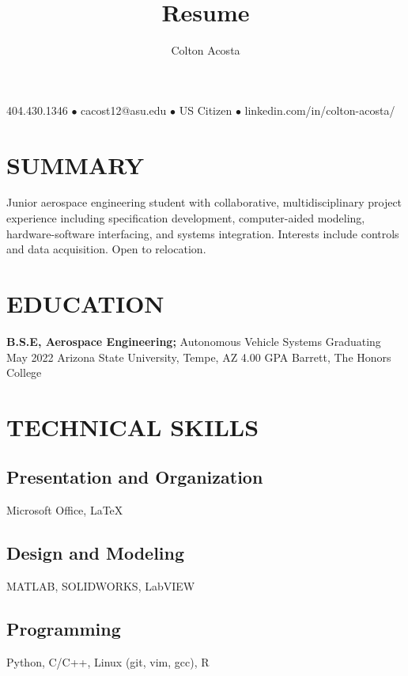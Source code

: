 \documentclass{article}
\makeatletter
\renewcommand{\maketitle}{
	\begin{center}
		{\huge\bfseries
			\theauthor}
			
		404.430.1346 $\bullet$ cacost12@asu.edu $\bullet$ US Citizen $\bullet$ linkedin.com/in/colton-acosta/
	\end{center}
}
\makeatother
\begin{document}
\title{Resume}
\author{Colton Acosta}
\maketitle
\section{SUMMARY}
Junior aerospace engineering student with collaborative, multidisciplinary project experience including specification development, computer-aided modeling, hardware-software interfacing, and systems integration. Interests include controls and data acquisition. Open to relocation. 
\section{EDUCATION}
\textbf{B.S.E, Aerospace Engineering;} Autonomous Vehicle Systems
\hfill 
Graduating May 2022
\linebreak
Arizona State University, Tempe, AZ 
\hfill
4.00 GPA
\linebreak
Barrett, The Honors College

\section{TECHNICAL SKILLS}
\subsection{Presentation and Organization}
Microsoft Office,  {\LaTeX}
\subsection{Design and Modeling}
MATLAB, SOLIDWORKS, LabVIEW
\subsection{Programming} 
Python, C/C++, Linux (git, vim, gcc), R
\end{document}
